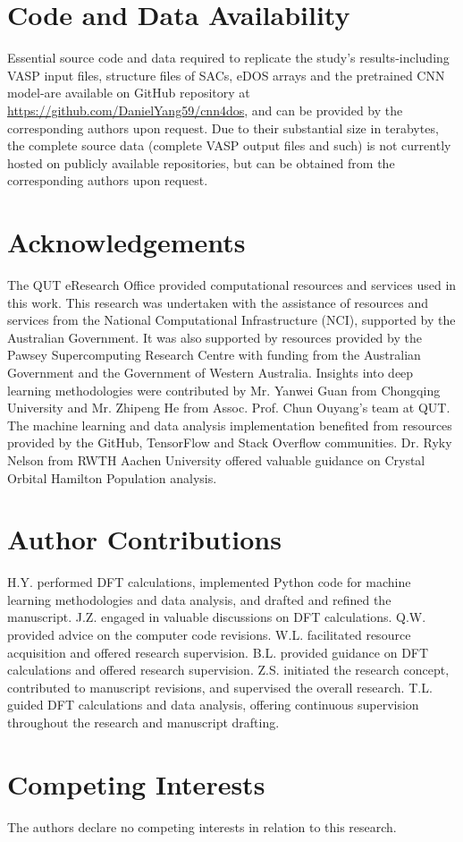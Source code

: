 
\section{Code and Data Availability}
Essential source code and data required to replicate the study's results-including VASP input files,
structure files of SACs, eDOS arrays and the pretrained CNN model-are available on GitHub repository
at \url{https://github.com/DanielYang59/cnn4dos}, and can be provided by the corresponding authors upon request.
Due to their substantial size in terabytes, the complete source data (complete VASP output files and such)
is not currently hosted on publicly available repositories,
but can be obtained from the corresponding authors upon request.

\section{Acknowledgements}
The QUT eResearch Office provided computational resources and services used in this work.
This research was undertaken with the assistance of resources and services from
the National Computational Infrastructure (NCI), supported by the Australian Government.
It was also supported by resources provided by the Pawsey Supercomputing Research Centre
with funding from the Australian Government and the Government of Western Australia.
Insights into deep learning methodologies were contributed by Mr. Yanwei Guan
from Chongqing University and Mr. Zhipeng He from Assoc. Prof. Chun Ouyang's team at QUT.
The machine learning and data analysis implementation benefited from
resources provided by the GitHub, TensorFlow and Stack Overflow communities.
Dr. Ryky Nelson from RWTH Aachen University offered valuable guidance on
Crystal Orbital Hamilton Population analysis.

\section{Author Contributions}
H.Y. performed DFT calculations, implemented Python code for
machine learning methodologies and data analysis,
and drafted and refined the manuscript.
J.Z. engaged in valuable discussions on DFT calculations.
Q.W. provided advice on the computer code revisions.
W.L. facilitated resource acquisition and offered research supervision.
B.L. provided guidance on DFT calculations and offered research supervision.
Z.S. initiated the research concept, contributed to manuscript revisions, and supervised the overall research.
T.L. guided DFT calculations and data analysis, offering continuous supervision
throughout the research and manuscript drafting.

\section{Competing Interests}
The authors declare no competing interests in relation to this research.
